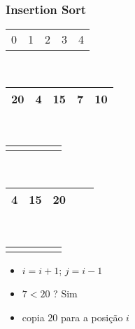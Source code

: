 \documentclass{beamer}
\begin{document}
\begin{frame}
    \frametitle{Insertion Sort}
    \begin{center}
        \begin{table}
            \begin{tabular}{p{0.25cm} p{0.25cm} p{0.25cm} p{0.25cm} p{0.25cm}}
                0 & 1 & 2 & 3 & 4
            \end{tabular} \\
            \begin{tabular}{| p{0.25cm} | p{0.25cm} | p{0.25cm} | p{0.25cm} | p{0.25cm} |}
                \hline
                20 & 4 & 15 & 7 & 10 \\ \hline
            \end{tabular} \\
            \begin{tabular}{p{0.25cm} p{0.25cm} p{0.25cm} p{0.25cm} p{0.25cm}}
                & & & \color{green}{$\uparrow$} &
            \end{tabular} \\
            \begin{tabular}{| p{0.25cm} | p{0.25cm} | p{0.25cm} | p{0.25cm} | p{0.25cm} |}
                \hline
                4 & 15 & 20 & & \\ \hline
            \end{tabular} \\
            \begin{tabular}{p{0.25cm} p{0.25cm} p{0.25cm} p{0.25cm} p{0.25cm}}
                & & \color{red}{$\uparrow$}  & \color{blue}{$\uparrow$} &
            \end{tabular}
        \end{table}
	\end{center}
    \color{green}{$ordenando = 7$}
    \begin{itemize}[<+->]
        \item $i = i + 1$; $j = i - 1$
        \item $7 < 20$ ? Sim
        \item copia $20$ para a posição $i$
    \end{itemize}
\end{frame}
\end{document}
